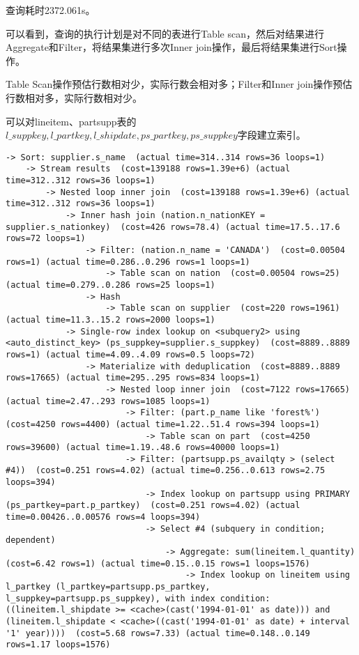 \documentclass{article}
\begin{document}
查询耗时2372.061s。

可以看到，查询的执行计划是对不同的表进行Table scan，然后对结果进行Aggregate和Filter，将结果集进行多次Inner join操作，最后将结果集进行Sort操作。

Table Scan操作预估行数相对少，实际行数会相对多；Filter和Inner join操作预估行数相对多，实际行数相对少。

可以对lineitem、partsupp表的$l\_suppkey,l\_partkey,l\_shipdate,ps\_partkey,ps\_suppkey$字段建立索引。

\begin{lstlisting}
-> Sort: supplier.s_name  (actual time=314..314 rows=36 loops=1)
    -> Stream results  (cost=139188 rows=1.39e+6) (actual time=312..312 rows=36 loops=1)
        -> Nested loop inner join  (cost=139188 rows=1.39e+6) (actual time=312..312 rows=36 loops=1)
            -> Inner hash join (nation.n_nationKEY = supplier.s_nationkey)  (cost=426 rows=78.4) (actual time=17.5..17.6 rows=72 loops=1)
                -> Filter: (nation.n_name = 'CANADA')  (cost=0.00504 rows=1) (actual time=0.286..0.296 rows=1 loops=1)
                    -> Table scan on nation  (cost=0.00504 rows=25) (actual time=0.279..0.286 rows=25 loops=1)
                -> Hash
                    -> Table scan on supplier  (cost=220 rows=1961) (actual time=11.3..15.2 rows=2000 loops=1)
            -> Single-row index lookup on <subquery2> using <auto_distinct_key> (ps_suppkey=supplier.s_suppkey)  (cost=8889..8889 rows=1) (actual time=4.09..4.09 rows=0.5 loops=72)
                -> Materialize with deduplication  (cost=8889..8889 rows=17665) (actual time=295..295 rows=834 loops=1)
                    -> Nested loop inner join  (cost=7122 rows=17665) (actual time=2.47..293 rows=1085 loops=1)
                        -> Filter: (part.p_name like 'forest%')  (cost=4250 rows=4400) (actual time=1.22..51.4 rows=394 loops=1)
                            -> Table scan on part  (cost=4250 rows=39600) (actual time=1.19..48.6 rows=40000 loops=1)
                        -> Filter: (partsupp.ps_availqty > (select #4))  (cost=0.251 rows=4.02) (actual time=0.256..0.613 rows=2.75 loops=394)
                            -> Index lookup on partsupp using PRIMARY (ps_partkey=part.p_partkey)  (cost=0.251 rows=4.02) (actual time=0.00426..0.00576 rows=4 loops=394)
                            -> Select #4 (subquery in condition; dependent)
                                -> Aggregate: sum(lineitem.l_quantity)  (cost=6.42 rows=1) (actual time=0.15..0.15 rows=1 loops=1576)
                                    -> Index lookup on lineitem using l_partkey (l_partkey=partsupp.ps_partkey, l_suppkey=partsupp.ps_suppkey), with index condition: ((lineitem.l_shipdate >= <cache>(cast('1994-01-01' as date))) and (lineitem.l_shipdate < <cache>((cast('1994-01-01' as date) + interval '1' year))))  (cost=5.68 rows=7.33) (actual time=0.148..0.149 rows=1.17 loops=1576)
\end{lstlisting}
\end{document}
